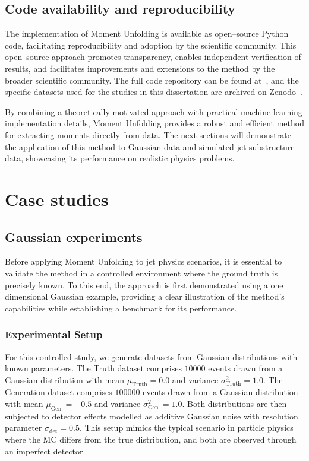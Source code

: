     \subsection{Code availability and reproducibility}
        The implementation of Moment Unfolding is available as open--source Python code, facilitating reproducibility and adoption by the scientific community.
        This open--source approach promotes transparency, enables independent verification of results, and facilitates improvements and extensions to the method by the broader scientific community.
        The full code repository can be found at~\cite{HEP-GAN/MomentUnfolding:Method}, and the specific datasets used for the studies in this dissertation are archived on Zenodo~\cite{AndreassenPythia/HerwigUnfolding}.

    By combining a theoretically motivated approach with practical machine learning implementation details, Moment Unfolding provides a robust and efficient method for extracting moments directly from data.
    The next sections will demonstrate the application of this method to Gaussian data and simulated jet substructure data, showcasing its performance on realistic physics problems.
    
\section{Case studies}
    \subsection{Gaussian experiments}
        Before applying Moment Unfolding to jet physics scenarios, it is essential to validate the method in a controlled environment where the ground truth is precisely known.
        To this end, the approach is first demonstrated using a one dimensional Gaussian example, providing a clear illustration of the method's capabilities while establishing a benchmark for its performance.
        \subsubsection{Experimental Setup}
            For this controlled study, we generate datasets from Gaussian distributions with known parameters.
            The Truth dataset comprises \(\num{10000}\) events drawn from a Gaussian distribution with mean \(\mu_{\textrm{Truth}} = 0.0\) and variance \(\sigma^2_{\textrm{Truth}} = 1.0\).
            The Generation dataset comprises \(\num{100000}\) events drawn from a Gaussian distribution with mean $\mu_{\textrm{Gen.}} = -0.5$ and variance $\sigma^2_{\textrm{Gen.}} = 1.0$.
            Both distributions are then subjected to detector effects modelled as additive Gaussian noise with resolution parameter $\sigma_{\textrm{det}} = 0.5$.
            This setup mimics the typical scenario in particle physics where the MC differs from the true distribution, and both are observed through an imperfect detector.

